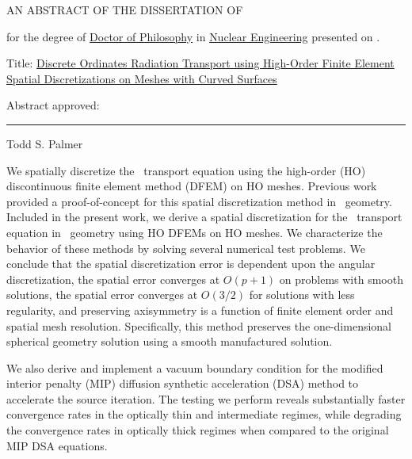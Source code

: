 \documentclass[12pt]{article}
\begin{document}
\begin{singlespace}

\begin{center}
AN ABSTRACT OF THE DISSERTATION OF
\end{center}

\vspace{12pt}

\noindent
\uline{\ThesisAuthor} for the degree of \uline{Doctor of Philosophy} in \uline{Nuclear Engineering} presented on \uline{\DefenseDate}.

\vspace{12pt}

\noindent
Title: \uline{Discrete Ordinates Radiation Transport using High-Order Finite Element Spatial Discretizations on Meshes with Curved Surfaces}

\vspace{12pt}

\noindent
Abstract approved:

\vspace{12pt}

\noindent
\begin{center}
\rule{\textwidth}{0.4pt}

\noindent
Todd S. Palmer
\end{center}

\vspace{12pt}

\end{singlespace}

We spatially discretize the \SN\ transport equation using the high-order (HO) discontinuous finite element method (DFEM) on HO meshes. Previous work provided a proof-of-concept for this spatial discretization method in \XY\ geometry. Included in the present work, we derive a spatial discretization for the \SN\ transport equation in \RZ\ geometry using HO DFEMs on HO meshes. We characterize the behavior of these methods by solving several numerical test problems. We conclude that the spatial discretization error is dependent upon the angular discretization, the spatial error converges at $O(p+1)$ on problems with smooth solutions, the spatial error converges at $O(3/2)$ for solutions with less regularity, and preserving axisymmetry is a function of finite element order and spatial mesh resolution. Specifically, this method preserves the one-dimensional spherical geometry solution using a smooth manufactured solution.

We also derive and implement a vacuum boundary condition for the modified interior penalty (MIP) diffusion synthetic acceleration (DSA) method to accelerate the source iteration. The testing we perform reveals substantially faster convergence rates in the optically thin and intermediate regimes, while degrading the convergence rates in optically thick regimes when compared to the original MIP DSA equations.
\end{document}
